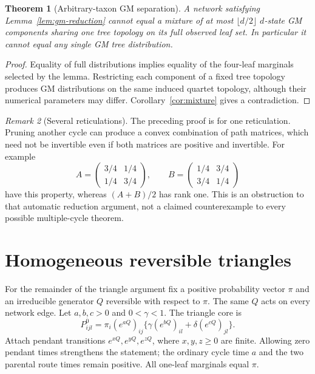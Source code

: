 \documentclass[11pt]{article}
\newtheorem{theorem}{Theorem}[section]
\theoremstyle{definition}
\theoremstyle{remark}
\newtheorem{remark}[theorem]{Remark}
\begin{document}
\begin{theorem}[Arbitrary-taxon GM separation]\label{thm:gm-network}
A network satisfying Lemma~\ref{lem:gm-reduction} cannot equal a mixture
of at most $\lfloor d/2\rfloor$ $d$-state GM components sharing one tree
topology on its full observed leaf set. In particular it cannot equal any
single GM tree distribution.
\end{theorem}
\begin{proof}
Equality of full distributions implies equality of the four-leaf marginals
selected by the lemma. Restricting each component of a fixed tree topology
produces GM distributions on the same induced quartet topology, although
their numerical parameters may differ. Corollary~\ref{cor:mixture} gives
a contradiction.
\end{proof}

\begin{remark}[Several reticulations]
The preceding proof is for one reticulation. Pruning another cycle can
produce a convex combination of path matrices, which need not be
invertible even if both matrices are positive and invertible. For example
\[
 A=\begin{pmatrix}3/4&1/4\\1/4&3/4\end{pmatrix},\qquad
 B=\begin{pmatrix}1/4&3/4\\3/4&1/4\end{pmatrix}
\]
have this property, whereas $(A+B)/2$ has rank one. This is an obstruction
to that automatic reduction argument, not a claimed counterexample to
every possible multiple-cycle theorem.
\end{remark}

\section{Homogeneous reversible triangles}\label{sec:triangle}

For the remainder of the triangle argument fix a positive probability
vector $\pi$ and an irreducible generator $Q$ reversible with respect to
$\pi$. The same $Q$ acts on every network edge. Let $a,b,c>0$ and
$0<\gamma<1$. The triangle core is
\begin{equation}\label{eq:triangle-core}
 P^0_{ijl}=\pi_i(e^{aQ})_{ij}
       \{\gamma(e^{bQ})_{il}+\delta(e^{cQ})_{jl}\}.
\end{equation}
Attach pendant transitions $e^{xQ},e^{yQ},e^{zQ}$, where $x,y,z\ge0$
are finite. Allowing zero pendant times strengthens the statement; the
ordinary cycle time $a$ and the two parental route times remain positive.
All one-leaf marginals equal $\pi$.
\end{document}
